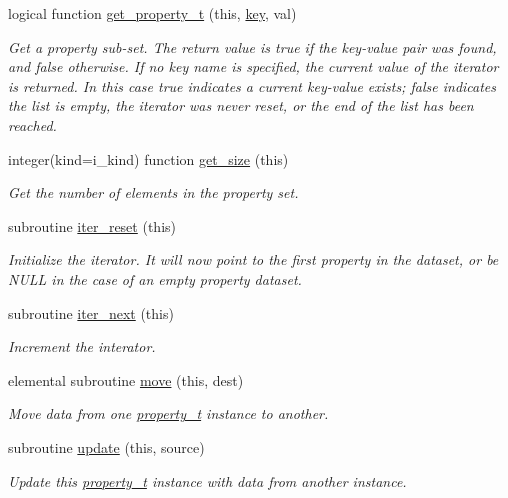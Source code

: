 \begin{DoxyCompactItemize}
logical function \mbox{\hyperlink{namespacepmc__property_a280146ecd87b8624c170babd262c92d3}{get\+\_\+property\+\_\+t}} (this, \mbox{\hyperlink{namespacepmc__property_a733aef8cbd02fbfed19bde913728678e}{key}}, val)
\begin{DoxyCompactList}\small\item\em Get a property sub-\/set. The return value is true if the key-\/value pair was found, and false otherwise. If no key name is specified, the current value of the iterator is returned. In this case true indicates a current key-\/value exists; false indicates the list is empty, the iterator was never reset, or the end of the list has been reached. \end{DoxyCompactList}\item 
integer(kind=i\+\_\+kind) function \mbox{\hyperlink{namespacepmc__property_a51142a5a96c616638b781bc56dd808a9}{get\+\_\+size}} (this)
\begin{DoxyCompactList}\small\item\em Get the number of elements in the property set. \end{DoxyCompactList}\item 
subroutine \mbox{\hyperlink{namespacepmc__property_ace8273ce459baf8c3e805c010f66103c}{iter\+\_\+reset}} (this)
\begin{DoxyCompactList}\small\item\em Initialize the iterator. It will now point to the first property in the dataset, or be N\+U\+LL in the case of an empty property dataset. \end{DoxyCompactList}\item 
subroutine \mbox{\hyperlink{namespacepmc__property_a8bde8118d90903ed86a787823b208eb5}{iter\+\_\+next}} (this)
\begin{DoxyCompactList}\small\item\em Increment the interator. \end{DoxyCompactList}\item 
elemental subroutine \mbox{\hyperlink{namespacepmc__property_abaf7837b3c0512087cad8e4e9c673b70}{move}} (this, dest)
\begin{DoxyCompactList}\small\item\em Move data from one \mbox{\hyperlink{structpmc__property_1_1property__t}{property\+\_\+t}} instance to another. \end{DoxyCompactList}\item 
subroutine \mbox{\hyperlink{namespacepmc__property_a5d890d5f6a8fb12ceb429ae3ebc217fe}{update}} (this, source)
\begin{DoxyCompactList}\small\item\em Update this \mbox{\hyperlink{structpmc__property_1_1property__t}{property\+\_\+t}} instance with data from another instance. \end{DoxyCompactList}\item 

\end{DoxyCompactItemize}
